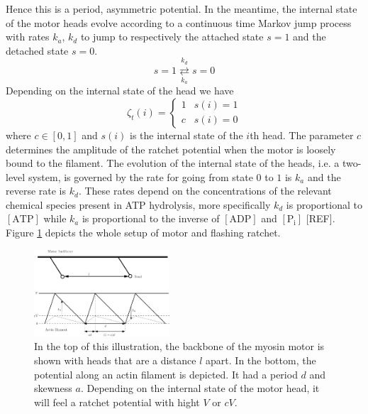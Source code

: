\documentclass[aps,pre,twocolumn,showpacs,showkeys,a4paper]{revtex4}
\begin{document}
Hence this is a period, asymmetric potential.
In the meantime, the internal state of the motor heads evolve according to a continuous time Markov jump process with rates $k_a$, $k_d$ to jump to respectively the attached state $s=1$ and the detached state $s=0$.
\begin{equation}
s = 1 \overset{k_d}{\underset{k_a}{\rightleftarrows}} s = 0
\end{equation}
Depending on the internal state of the head we have 
\begin{equation}
\zeta_t(i) =  \begin{cases} 
      1 & s(i) = 1\\
      c & s(i) = 0
   \end{cases}
\end{equation}
where $c\in\left[0,1\right]$ and $s(i)$ is the internal state of the $i$th head. 
The parameter $c$ determines the amplitude of the ratchet potential when the motor is loosely bound to the filament. 
The evolution of the internal state of the heads, i.e. a two-level system, is governed by the rate for going from state $0$ to $1$ is $k_{a}$ and the reverse rate is $k_{d}$.
These rates depend on the concentrations of the relevant chemical species present in ATP hydrolysis, more specifically $k_{d}$ is proportional to $[\text{ATP}]$ while $k_{a}$ is proportional to the inverse of $[\text{ADP}]$ and $[\text{P}_\text{i}]$ [REF]. 
Figure \ref{Fig: ratchet setup} depicts the whole setup of motor and flashing ratchet. 
\begin{figure}[t]
\centering
\includegraphics[width=0.45\textwidth,height=!]{ratchet_illustration}
\caption{In the top of this illustration, the backbone of the myosin motor is shown with heads that are a distance $l$ apart. 
In the bottom, the potential along an actin filament is depicted. 
It had a period $d$ and skewness $a$. 
Depending on the internal state of the motor head, it will feel a ratchet potential with hight $V$ or $cV$.} 
\label{Fig: ratchet setup}
\end{figure}
\end{document}
